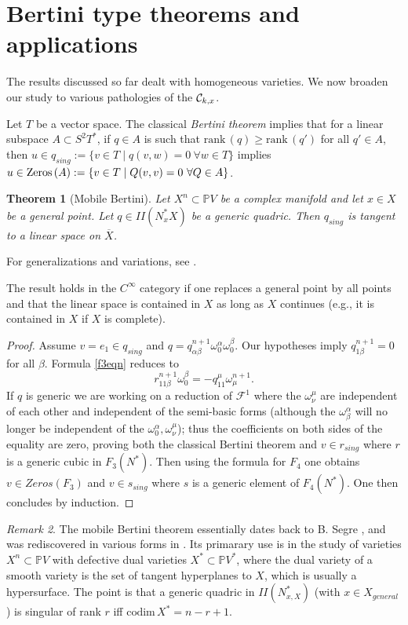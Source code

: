 \documentclass[11pt]{amsart}
\newtheorem{theorem}{Theorem}[section]
\theoremstyle{definition}
\theoremstyle{remark}
\newtheorem{remark}[theorem]{Remark}
\numberwithin{equation}{section}
\def\ooo#1#2{\omega^{#1}_{#2}}\def\xxx#1#2{x^{#1}_{#2}}
\def\oo#1{\omega^{#1}_0}
\def\qq#1#2#3{q^{#1}_{{#2} {#3}}}
\def\rr#1#2#3#4{r^{#1}_{{#2} {#3}{#4}}}
\def\cf{\mathcal F}
\def\trank{\text{rank}}
\def\BP{\mathbb P}
\def\a{\alpha}
\def\b{\beta}
\def\tcodim{\text{codim}\,}
\def\trank{\text{rank}\,}
\begin{document}
 

\section{Bertini type theorems and applications}

The results discussed so far dealt with homogeneous varieties. We now
broaden our study to various pathologies of the ${\mathcal C}_{k,x}$.

Let $T$ be a vector space.  The classical {\it Bertini theorem} implies that
for a linear subspace $A\subset S^2T^*$, if $q\in A$ is such
that $\trank(q)\geq \trank(q')$ for all $q'\in A$, then
$u\in q_{sing}:=\{ v\in T\mid q(v,w)=0\ \forall w\in T\}$ implies $u\in
{\rm Zeros}\,(A):=\{ v\in T\mid Q(v,v)=0\ \forall Q\in A\}$.

\begin{theorem}[Mobile Bertini] \label{bertthm}
Let $X^n\subset \BP V$ be a complex manifold and let $x\in X$ be a
general point.
Let $q\in II(N^*_xX)$ be a generic quadric.  Then
  $q_{sing}$
is tangent to a linear space on   $\overline X$.
\end{theorem}

For generalizations and variations, see \cite{Lchss}.

The result holds in the $C^{\infty}$ category if one replaces a general point
by all points and that the linear space is contained in $X$ as long as $X$
continues (e.g., it is   contained in $X$ if $X$ is complete).

 

\begin{proof} 
Assume $v=  e_1\in q_{sing}$ and $q=q^{n+1}_{\a\b}\oo\a\oo\b$. Our hypotheses imply
$\qq{n+1} 1\b=0$ for all $\b$. Formula \eqref{f3eqn} reduces to
$$
\rr{n+1} 11\b\oo\b= -\qq{\mu} 11\ooo{n+1}\mu .
$$
If $q$ is generic we are   working on a reduction of $\cf^1$
where    the
$\ooo\mu\nu$ are independent of each other and independent of the semi-basic forms
(although the $\ooo\a\b$ will no longer be independent of the 
$\oo\a,\ooo\mu\nu$); thus the
coefficients on both sides of the equality are zero, proving both the
classical Bertini theorem and 
$v\in r_{sing}$ where $r$ is a generic cubic in $F_3(N^*)$. Then
using the formula for $F_4$ one obtains $v\in Zeros(F_3)$ and
$v\in s_{sing}$ where $s$ is a generic element of $F_4(N^*)$.
One then concludes by induction.
\end{proof}

\begin{remark} The mobile Bertini theorem
essentially  dates back to B. Segre \cite{bsegre}, and was
rediscovered in various forms in \cite{GH,Ein}. Its primarary use is in the
study of varieties  $X^n\subset \BP V$ with defective dual varieties
$X^*\subset \BP V^*$, where the dual variety of a smooth variety is the  
set of tangent hyperplanes to $X$, which is usually
a hypersurface. The point is that a generic quadric
in $II(N^*_{x,X})$ (with $x\in X_{general}$) is singular of rank $r$ 
iff $\tcodim X^*=n-r+1$. 
\end{remark}
 
\end{document}
